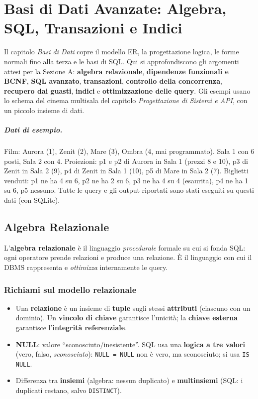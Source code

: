 \chapter[Basi di Dati Avanzate]{Basi di Dati Avanzate: Algebra, SQL, Transazioni e Indici}

Il capitolo \emph{Basi di Dati} copre il modello ER, la progettazione logica, le forme normali fino alla terza e le basi di SQL. Qui si approfondiscono gli argomenti attesi per la Sezione A: \textbf{algebra relazionale}, \textbf{dipendenze funzionali e BCNF}, \textbf{SQL avanzato}, \textbf{transazioni}, \textbf{controllo della concorrenza}, \textbf{recupero dai guasti}, \textbf{indici} e \textbf{ottimizzazione delle query}. Gli esempi usano lo schema del cinema multisala del capitolo \emph{Progettazione di Sistemi e API}, con un piccolo insieme di dati.

\paragraph{Dati di esempio.}
Film: Aurora (1), Zenit (2), Mare (3), Ombra (4, mai programmato). Sala 1 con 6 posti, Sala 2 con 4. Proiezioni: p1 e p2 di Aurora in Sala 1 (prezzi 8 e 10), p3 di Zenit in Sala 2 (9), p4 di Zenit in Sala 1 (10), p5 di Mare in Sala 2 (7). Biglietti venduti: p1 ne ha 4 su 6, p2 ne ha 2 su 6, p3 ne ha 4 su 4 (esaurita), p4 ne ha 1 su 6, p5 nessuno. Tutte le query e gli output riportati sono stati eseguiti su questi dati (con SQLite).

\section{Algebra Relazionale}
L'\textbf{algebra relazionale} è il linguaggio \emph{procedurale} formale su cui si fonda SQL: ogni operatore prende relazioni e produce una relazione. È il linguaggio con cui il DBMS rappresenta e \emph{ottimizza} internamente le query.

\subsection{Richiami sul modello relazionale}
\begin{itemize}
    \item Una \textbf{relazione} è un insieme di \textbf{tuple} sugli stessi \textbf{attributi} (ciascuno con un dominio). Un \textbf{vincolo di chiave} garantisce l'unicità; la \textbf{chiave esterna} garantisce l'\textbf{integrità referenziale}.
    \item \textbf{NULL}: valore ``sconosciuto/inesistente''. SQL usa una \textbf{logica a tre valori} (vero, falso, \emph{sconosciuto}): \texttt{NULL = NULL} non è vero, ma sconosciuto; si usa \texttt{IS NULL}.
    \item Differenza tra \textbf{insiemi} (algebra: nessun duplicato) e \textbf{multinsiemi} (SQL: i duplicati restano, salvo \texttt{DISTINCT}).
\end{itemize}

